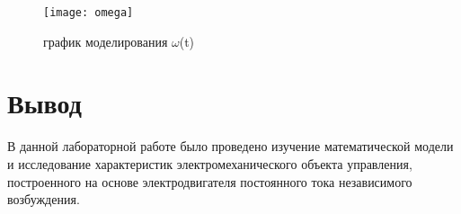 \begin{figure}[H]
	\begin{center}
		\texttt{[image: omega]}
		\caption{график моделирования $\omega$(t)} 
		\label{pic:pic_5} %
	\end{center}
\end{figure}

\newpage

\section{Вывод}
В данной лабораторной работе было проведено изучение математической модели и исследование характеристик электромеханического объекта управления, построенного на основе электродвигателя постоянного тока независимого возбуждения.

